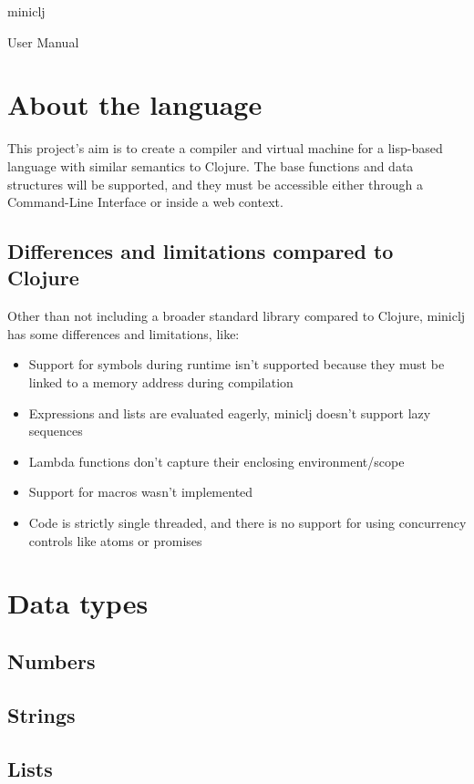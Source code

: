 \documentclass[11pt]{scrreprt}
\begin{document}
{\centering
{\huge
miniclj\par}
{\LARGE
User Manual\par}}

\tableofcontents

\chapter{About the language}
This project's aim is to create a compiler and virtual machine for a lisp-based language with similar semantics to Clojure. The base functions and data structures will be supported, and they must be accessible either through a Command-Line Interface or inside a web context.

\section{Differences and limitations compared to Clojure}
Other than not including a broader standard library compared to Clojure, miniclj has some differences and limitations, like:
\begin{itemize}
    \item Support for symbols during runtime isn't supported because they must be linked to a memory address during compilation
    \item Expressions and lists are evaluated eagerly, miniclj doesn't support lazy sequences
    \item Lambda functions don't capture their enclosing environment/scope
    \item Support for macros wasn't implemented
    \item Code is strictly single threaded, and there is no support for using concurrency controls like atoms or promises
\end{itemize}

\chapter{Data types}
\section{Numbers}

\section{Strings}

\section{Lists}
\end{document}
